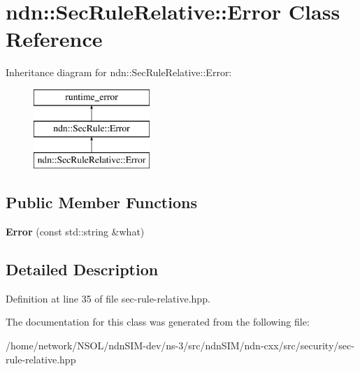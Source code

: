 \hypertarget{classndn_1_1SecRuleRelative_1_1Error}{}\section{ndn\+:\+:Sec\+Rule\+Relative\+:\+:Error Class Reference}
\label{classndn_1_1SecRuleRelative_1_1Error}
Inheritance diagram for ndn\+:\+:Sec\+Rule\+Relative\+:\+:Error\+:\begin{figure}[H]
\begin{center}
\leavevmode
\includegraphics[height=3.000000cm]{classndn_1_1SecRuleRelative_1_1Error}
\end{center}
\end{figure}
\subsection*{Public Member Functions}
\begin{DoxyCompactItemize}
\item 
{\bfseries Error} (const std\+::string \&what)\hypertarget{classndn_1_1SecRuleRelative_1_1Error_a28865f4042bdbb063578ae220f50a5b1}{}\label{classndn_1_1SecRuleRelative_1_1Error_a28865f4042bdbb063578ae220f50a5b1}

\end{DoxyCompactItemize}


\subsection{Detailed Description}


Definition at line 35 of file sec-\/rule-\/relative.\+hpp.



The documentation for this class was generated from the following file\+:\begin{DoxyCompactItemize}
\item 
/home/network/\+N\+S\+O\+L/ndn\+S\+I\+M-\/dev/ns-\/3/src/ndn\+S\+I\+M/ndn-\/cxx/src/security/sec-\/rule-\/relative.\+hpp\end{DoxyCompactItemize}
